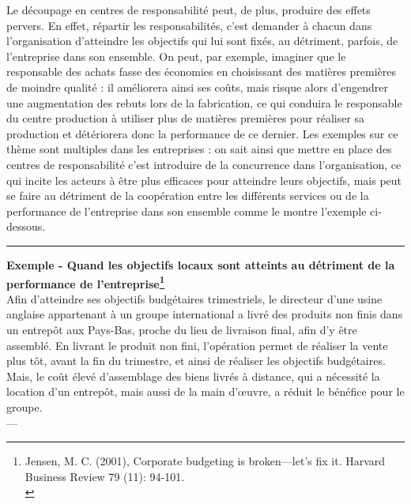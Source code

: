 \documentclass{kaobook}
\begin{document}
Le découpage en centres de responsabilité peut, de plus, produire des effets pervers. En effet, répartir les responsabilités, c’est demander à chacun dans l’organisation d’atteindre les objectifs qui lui sont fixés, au détriment, parfois, de l’entreprise dans son ensemble. On peut, par exemple, imaginer que le responsable des achats fasse des économies en choisissant des matières premières de moindre qualité : il améliorera ainsi ses coûts, mais risque alors d’engendrer une augmentation des rebuts lors de la fabrication, ce qui conduira le responsable du centre production à utiliser plus de matières premières pour réaliser sa production et détériorera donc la performance de ce dernier. Les exemples sur ce thème sont multiples dans les entreprises : on sait ainsi que mettre en place des centres de responsabilité c’est introduire de la concurrence dans l’organisation, ce qui incite les acteurs à être plus efficaces pour atteindre leurs objectifs, mais peut se faire au détriment de la coopération entre les différents services ou de la performance de l’entreprise dans son ensemble comme le montre l’exemple ci-dessous.\\

\noindent\rule{\textwidth}{0.5pt}
\textbf{Exemple - Quand les objectifs locaux sont atteints au détriment de la performance de l’entreprise\footnote{Jensen, M. C. (2001), Corporate budgeting is broken—let's fix it. Harvard Business Review 79 (11): 94-101.\\}}\\
Afin d’atteindre ses objectifs budgétaires trimestriels, le directeur d’une usine anglaise appartenant à un groupe international a livré des produits non finis dans un entrepôt aux Pays-Bas, proche du lieu de livraison final, afin d’y être assemblé. En livrant le produit non fini, l’opération permet de réaliser la vente plus tôt, avant la fin du trimestre, et ainsi de réaliser les objectifs budgétaires. Mais, le coût élevé d’assemblage des biens livrés à distance, qui a nécessité la location d’un entrepôt, mais aussi de la main d’œuvre, a réduit le bénéfice pour le groupe.\\
---\\
\end{document}
